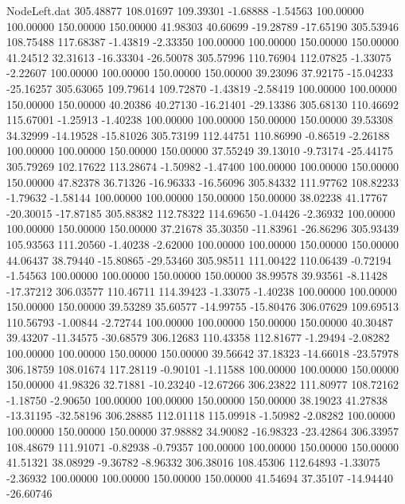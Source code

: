 \begin{filecontents}{NodeLeft.dat}
 305.48877  108.01697  109.39301    -1.68888   -1.54563  100.00000  100.00000  150.00000  150.00000   41.98303   40.60699  -19.28789  -17.65190
 305.53946  108.75488  117.68387    -1.43819   -2.33350  100.00000  100.00000  150.00000  150.00000   41.24512   32.31613  -16.33304  -26.50078
 305.57996  110.76904  112.07825    -1.33075   -2.22607  100.00000  100.00000  150.00000  150.00000   39.23096   37.92175  -15.04233  -25.16257
 305.63065  109.79614  109.72870    -1.43819   -2.58419  100.00000  100.00000  150.00000  150.00000   40.20386   40.27130  -16.21401  -29.13386
 305.68130  110.46692  115.67001    -1.25913   -1.40238  100.00000  100.00000  150.00000  150.00000   39.53308   34.32999  -14.19528  -15.81026
 305.73199  112.44751  110.86990    -0.86519   -2.26188  100.00000  100.00000  150.00000  150.00000   37.55249   39.13010   -9.73174  -25.44175
 305.79269  102.17622  113.28674    -1.50982   -1.47400  100.00000  100.00000  150.00000  150.00000   47.82378   36.71326  -16.96333  -16.56096
 305.84332  111.97762  108.82233    -1.79632   -1.58144  100.00000  100.00000  150.00000  150.00000   38.02238   41.17767  -20.30015  -17.87185
 305.88382  112.78322  114.69650    -1.04426   -2.36932  100.00000  100.00000  150.00000  150.00000   37.21678   35.30350  -11.83961  -26.86296
 305.93439  105.93563  111.20560    -1.40238   -2.62000  100.00000  100.00000  150.00000  150.00000   44.06437   38.79440  -15.80865  -29.53460
 305.98511  111.00422  110.06439    -0.72194   -1.54563  100.00000  100.00000  150.00000  150.00000   38.99578   39.93561   -8.11428  -17.37212
 306.03577  110.46711  114.39423    -1.33075   -1.40238  100.00000  100.00000  150.00000  150.00000   39.53289   35.60577  -14.99755  -15.80476
 306.07629  109.69513  110.56793    -1.00844   -2.72744  100.00000  100.00000  150.00000  150.00000   40.30487   39.43207  -11.34575  -30.68579
 306.12683  110.43358  112.81677    -1.29494   -2.08282  100.00000  100.00000  150.00000  150.00000   39.56642   37.18323  -14.66018  -23.57978
 306.18759  108.01674  117.28119    -0.90101   -1.11588  100.00000  100.00000  150.00000  150.00000   41.98326   32.71881  -10.23240  -12.67266
 306.23822  111.80977  108.72162    -1.18750   -2.90650  100.00000  100.00000  150.00000  150.00000   38.19023   41.27838  -13.31195  -32.58196
 306.28885  112.01118  115.09918    -1.50982   -2.08282  100.00000  100.00000  150.00000  150.00000   37.98882   34.90082  -16.98323  -23.42864
 306.33957  108.48679  111.91071    -0.82938   -0.79357  100.00000  100.00000  150.00000  150.00000   41.51321   38.08929   -9.36782   -8.96332
 306.38016  108.45306  112.64893    -1.33075   -2.36932  100.00000  100.00000  150.00000  150.00000   41.54694   37.35107  -14.94440  -26.60746

\end{filecontents}

